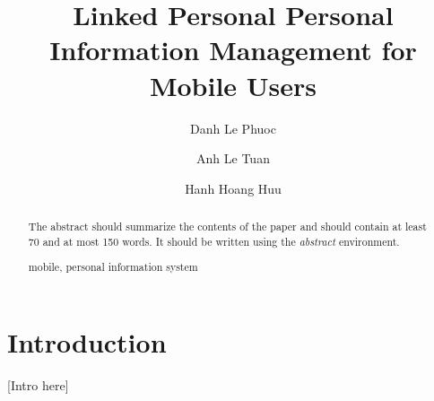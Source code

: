 \documentclass[runningheads,a4paper]{llncs}
\newcommand{\keywords}[1]{\par\addvspace\baselineskip
\noindent\keywordname\enspace\ignorespaces#1}
\begin{document}
\mainmatter  %

\title{Linked Personal Personal Information Management  for Mobile Users}


%
%
\author{Danh Le Phuoc
\and Anh Le Tuan\and Hanh Hoang Huu}
%


%
%

\maketitle


\begin{abstract}
The abstract should summarize the contents of the paper and should
contain at least 70 and at most 150 words. It should be written using the
\emph{abstract} environment.
\keywords{mobile, personal information system}
\end{abstract}


\section{Introduction}
[Intro here]
\end{document}
